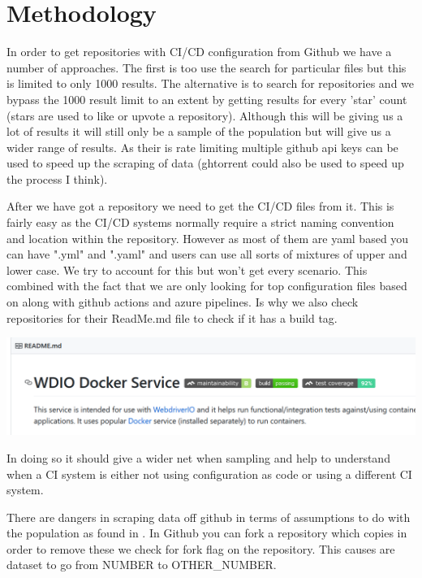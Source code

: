\documentclass[twoside,12pt,titlepage,a4paper]{article}
\begin{document}
\label{Continous integeration}

\cite{Hilton2016}

\section{Methodology}
\label{methodology}

In order to get repositories with CI/CD configuration from Github we have a number of approaches. The first is too use the search for particular files but this is limited to only 1000 results. The alternative is to search for repositories and we bypass the 1000 result limit to an extent by getting results for every 'star' count (stars are used to like or upvote a repository). Although this will be giving us a lot of results it will still only be a sample of the population but will give us a wider range of results. As their is rate limiting multiple github api keys can be used to speed up the scraping of data (ghtorrent could also be used to speed up the process I think).

After we have got a repository we need to get the CI/CD files from it. This is fairly easy as the CI/CD systems normally require a strict naming convention and location within the repository. However as most of them are yaml based you can have ".yml" and ".yaml" and users can use all sorts of mixtures of upper and lower case. We try to account for this but won't get every scenario. This combined with the fact that we are only looking for top configuration files based on \cite{Github2017} along with github actions and azure pipelines. Is why we also check repositories for their ReadMe.md file to check if it has a build tag.

\includegraphics[scale=0.5]{2020-01-30-08-29-04.png}

In doing so it should give a wider net when sampling and help to understand when a CI system is either not using configuration as code or using a different CI system.

There are dangers in scraping data off github in terms of assumptions to do with the population as found in \cite{Kalliamvakou2014}. In Github you can fork a repository which copies in order to remove these we check for fork flag on the repository. This causes are dataset to go from NUMBER to OTHER\_NUMBER.
\end{document}
